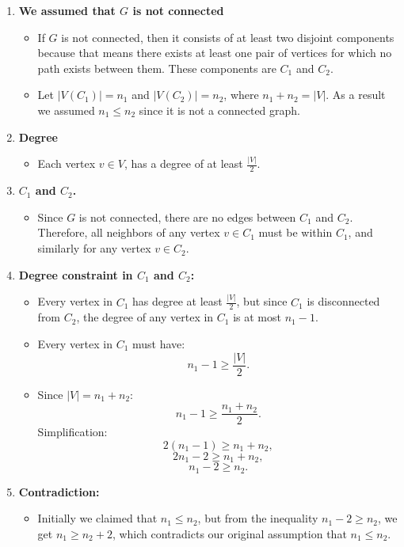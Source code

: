 \documentclass[12pt]{article}
\begin{document}
\begin{enumerate}
    \item \textbf{We assumed that $G$ is not connected}
    \begin{itemize}
        \item If $G$ is not connected, then it consists of at least two disjoint components because that means there exists at least one pair of vertices for which no path exists between them. These components are $C_1$ and $C_2$.
        \item Let $|V(C_1)| = n_1$ and $|V(C_2)| = n_2$, where $n_1 + n_2 = |V|$. As a result we assumed $n_1 \leq n_2$ since it is not a connected graph.
    \end{itemize}
    
    \item \textbf{Degree}
    \begin{itemize}
\item Each vertex $v \in V$, has a degree of at least $\frac{|V|}{2}$.
    \end{itemize}
    
    \item \textbf{$C_1$ and $C_2$.}
    \begin{itemize}
        \item Since $G$ is not connected, there are no edges between $C_1$ and $C_2$. Therefore, all neighbors of any vertex $v \in C_1$ must be within $C_1$, and similarly for any vertex $v \in C_2$.
    \end{itemize}
    
    \item \textbf{Degree constraint in $C_1$ and $C_2$:}
    \begin{itemize}
        \item Every vertex in $C_1$ has degree at least $\frac{|V|}{2}$, but since $C_1$ is disconnected from $C_2$, the degree of any vertex in $C_1$ is at most $n_1 - 1$.
        \item Every vertex in $C_1$ must have:
        \[
        n_1 - 1 \geq \frac{|V|}{2}.
        \]
        \item Since $|V| = n_1 + n_2$:
        \[
        n_1 - 1 \geq \frac{n_1 + n_2}{2}.
        \]
        Simplification:
        \[
        2(n_1 - 1) \geq n_1 + n_2,
        \]
        \[
        2n_1 - 2 \geq n_1 + n_2,
        \]
        \[
        n_1 - 2 \geq n_2.
        \]
    \end{itemize}
    
    \item \textbf{Contradiction:}
    \begin{itemize}
        \item Initially we claimed that $n_1 \leq n_2$, but from the inequality $n_1 - 2 \geq n_2$, we get $n_1 \geq n_2 + 2$, which contradicts our original assumption that $n_1 \leq n_2$.
    \end{itemize}
    

\end{enumerate}
\end{document}
